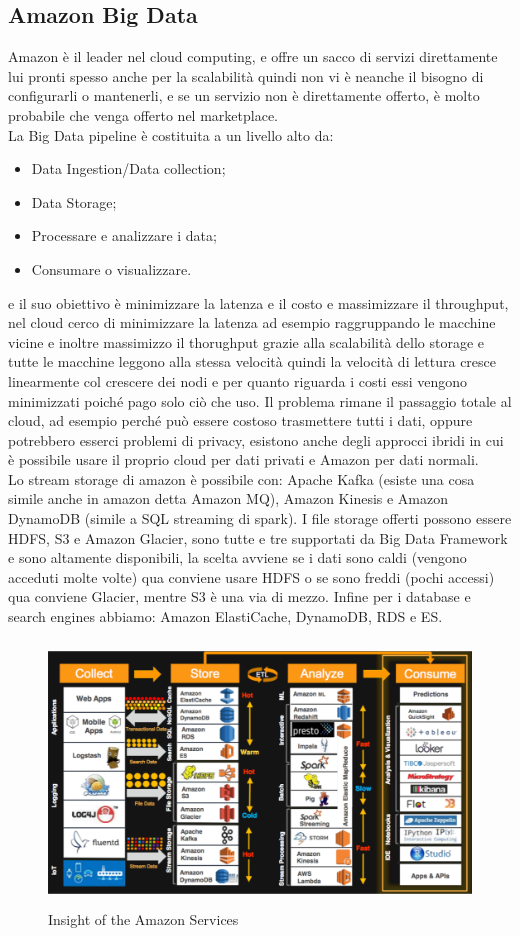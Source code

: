 \documentclass[11pt, twocolumn]{article}
\newenvironment{myitemize}
{ \begin{itemize}[topsep=0ex]
		\setlength{\itemsep}{0pt}
		\setlength{\parskip}{0pt}
		\setlength{\parsep}{0pt}     }
	{ \end{itemize}                  }
\begin{document}
\subsection{Amazon Big Data}
Amazon è il leader nel cloud computing, e offre un sacco di servizi direttamente lui pronti spesso anche per la scalabilità quindi non vi è neanche il bisogno di configurarli o mantenerli, e se un servizio non è direttamente offerto, è molto probabile che venga offerto nel marketplace. \\
La Big Data pipeline è costituita a un livello alto da:
\begin{myitemize}
	\item Data Ingestion/Data collection;
	\item Data Storage;
	\item Processare e analizzare i data;
	\item Consumare o visualizzare.
\end{myitemize}
e il suo obiettivo è minimizzare la latenza e il costo e massimizzare il throughput, nel cloud cerco di minimizzare la latenza ad esempio raggruppando le macchine vicine e inoltre massimizzo il thorughput grazie alla scalabilità dello storage e tutte le macchine leggono alla stessa velocità quindi la velocità di lettura cresce linearmente col crescere dei nodi e per quanto riguarda i costi essi vengono minimizzati poiché pago solo ciò che uso.
Il problema rimane il passaggio totale al cloud, ad esempio perché può essere costoso trasmettere tutti i dati, oppure potrebbero esserci problemi di privacy, esistono anche degli approcci ibridi in cui è possibile usare il proprio cloud per dati privati e Amazon per dati normali.\\
Lo stream storage di amazon è possibile con: Apache Kafka (esiste una cosa simile anche in amazon detta Amazon MQ), Amazon Kinesis e Amazon DynamoDB (simile a SQL streaming di spark). 
I file storage offerti possono essere HDFS, S3 e Amazon Glacier, sono tutte e tre supportati da Big Data Framework e sono altamente disponibili, la scelta avviene se i dati sono caldi (vengono acceduti molte volte) qua conviene usare HDFS o se sono freddi (pochi accessi) qua conviene Glacier, mentre S3 è una via di mezzo. Infine per i database e search engines abbiamo: Amazon ElastiCache, DynamoDB, RDS e ES.

\begin{figure}
  \centering
  \includegraphics[width=\linewidth,height=7cm]{imgs/amazon_insight.png}
  \caption{Insight of the Amazon Services}
  \label{fig:amazon}
\end{figure}
\end{document}
